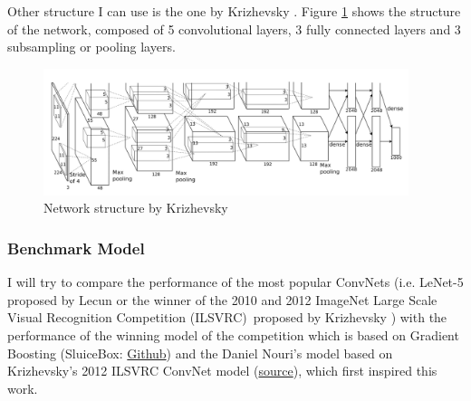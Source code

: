 \documentclass[]{article}
\newcommand{\imagenet}{ImageNet Large Scale Visual Recognition Competition (ILSVRC)}
\begin{document}
Other structure I can use is the one by Krizhevsky \cite{Krizhevsky12}. Figure \ref{img:imagenet12} shows the structure of the network, composed of 5 convolutional layers, 3 fully connected layers and 3 subsampling or pooling layers.

\begin{figure}[htpb!]
\centering
\includegraphics[width= 0.95\textwidth]{images/imagenet12}
\caption{Network structure by Krizhevsky \cite{Krizhevsky12} \label{img:imagenet12}}
\end{figure}


\subsubsection{Benchmark Model}\label{benchmark-model}

I will try to compare the performance of the most popular ConvNets (i.e. LeNet-5 proposed by Lecun \cite{Lecun98} or the winner of the 2010 and 2012 \imagenet \, proposed by Krizhevsky \cite{Krizhevsky12}) with the performance of the winning model of the competition which is based on Gradient Boosting (SluiceBox: \href{https://github.com/nmkridler/moby}{Github}) and the Daniel Nouri's model based on Krizhevsky's 2012 ILSVRC ConvNet model \cite{Krizhevsky12} (\href{https://speakerdeck.com/dnouri/practical-deep-neural-nets-for-detecting-marine-mammals/}{source}), which first inspired this work.
\end{document}
